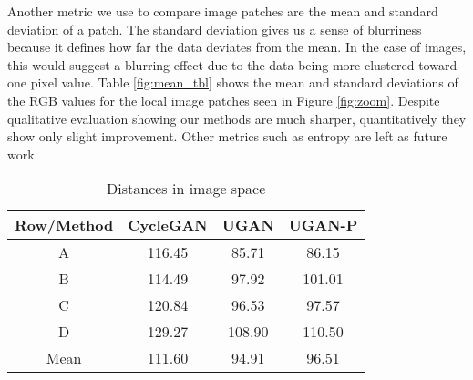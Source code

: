 Another metric we use to compare image patches are the mean and standard deviation of a patch. The standard deviation gives us a 
sense of blurriness because it defines how far the data deviates from the mean. In 
the case of images, this would suggest a blurring effect due to the data being more clustered toward one pixel value. Table 
\ref{fig:mean_tbl} shows the mean and standard deviations of the RGB values for the local image patches seen in Figure 
\ref{fig:zoom}. Despite qualitative evaluation showing our methods are much sharper, quantitatively they show only slight 
improvement. Other metrics such as entropy are left as future work.

\begin{table}
\centering
\footnotesize
\caption{Distances in image space}
\begin{tabular}{| c | c | c | c |}
   \hline
   Row/Method & CycleGAN & \textbf{UGAN} & \textbf{UGAN-P} \\ \hline
   A          & 116.45 & 85.71  & 86.15  \\ \hline
   B          & 114.49 & 97.92  & 101.01 \\ \hline
   C          & 120.84 & 96.53  & 97.57  \\ \hline
   D          & 129.27 & 108.90 & 110.50 \\ \hline
   Mean       & 111.60 & 94.91  & 96.51 \\ \hline
\end{tabular}
\label{tab:one}
\end{table}


